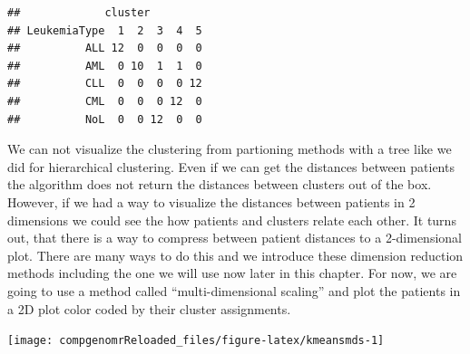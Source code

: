 \documentclass[12pt,]{krantz}
\newenvironment{Shaded}{\begin{snugshade}}{\end{snugshade}}
\newcommand{\CommentTok}[1]{\textcolor[rgb]{0.56,0.35,0.01}{\textit{#1}}}
\newcommand{\DataTypeTok}[1]{\textcolor[rgb]{0.13,0.29,0.53}{#1}}
\newcommand{\DecValTok}[1]{\textcolor[rgb]{0.00,0.00,0.81}{#1}}
\newcommand{\KeywordTok}[1]{\textcolor[rgb]{0.13,0.29,0.53}{\textbf{#1}}}
\newcommand{\NormalTok}[1]{#1}
\newcommand{\OperatorTok}[1]{\textcolor[rgb]{0.81,0.36,0.00}{\textbf{#1}}}
\newcommand{\OtherTok}[1]{\textcolor[rgb]{0.56,0.35,0.01}{#1}}
\newcommand{\StringTok}[1]{\textcolor[rgb]{0.31,0.60,0.02}{#1}}
\begin{document}
\begin{verbatim}
##             cluster
## LeukemiaType  1  2  3  4  5
##          ALL 12  0  0  0  0
##          AML  0 10  1  1  0
##          CLL  0  0  0  0 12
##          CML  0  0  0 12  0
##          NoL  0  0 12  0  0
\end{verbatim}

We can not visualize the clustering from partioning methods with a tree like we did for hierarchical clustering. Even if we can get the distances between patients the algorithm does not return the distances between clusters out of the box. However, if we had a way to visualize the distances between patients in 2 dimensions we could see the how patients and clusters relate each other. It turns out, that there is a way to compress between patient distances to a 2-dimensional plot. There are many ways to do this and we introduce these dimension reduction methods including the one we will use now later in this chapter. For now, we are going to use a method called ``multi-dimensional scaling'' and plot the patients in a 2D plot color coded by their cluster assignments.

\begin{Shaded}
\end{Shaded}

\begin{center}\texttt{[image: compgenomrReloaded\_files/figure-latex/kmeansmds-1]} \end{center}
\end{document}
